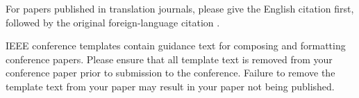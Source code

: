 \documentclass[conference]{IEEEtran}
\begin{document}
For papers published in translation journals, please give the English 
citation first, followed by the original foreign-language citation \cite{b6}.

\printbibliography %
\vspace{12pt}
\color{red}
IEEE conference templates contain guidance text for composing and formatting conference papers. Please ensure that all template text is removed from your conference paper prior to submission to the conference. Failure to remove the template text from your paper may result in your paper not being published.
\end{document}
